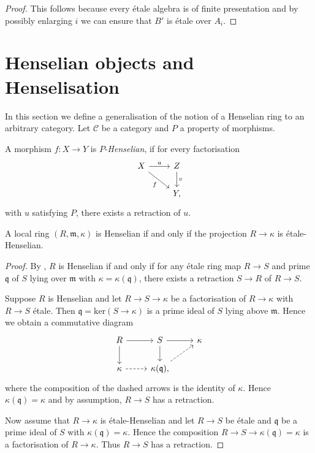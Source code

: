 \begin{proof}
    This follows because every étale algebra is of finite presentation and by possibly enlarging $i$ we can ensure
    that $B'$ is étale over $A_i$.
\end{proof}

\section{Henselian objects and Henselisation}

In this section we define a generalisation of the notion of a Henselian ring to an arbitrary category. Let $\mathcal{C}$ be a category
and $P$ a property of morphisms.

\begin{definition}[Henselian]
    A morphism $f\colon X \to Y$ is $P$-\emph{Henselian}, if for every factorisation
    \[
    \begin{tikzcd}
        X \arrow{r}{u} \arrow[swap]{dr}{f} & Z \arrow{d}{v} \\
                    & Y,
    \end{tikzcd}
    \] with $u$ satisfying $P$, there exists a retraction of $u$.
\end{definition}

\begin{example}
    A local ring $(R, \mathfrak{m}, \kappa)$ is Henselian if and only if the projection $R \to \kappa$ is étale-Henselian.
\end{example}

\begin{proof}
    By {\cite[\href{https://stacks.math.columbia.edu/tag/04GG}{Tag 04GG}]{stacks-project}}, $R$ is Henselian if and only if
    for any étale ring map $R \to S$ and prime $\mathfrak{q}$ of $S$ lying over $\mathfrak{m}$ with $\kappa = \kappa(\mathfrak{q})$,
    there exists a retraction $S \to R$ of $R \to S$.

    Suppose $R$ is Henselian and let $R \to S \to \kappa$ be a factorisation of $R \to \kappa$ with $R \to S$ étale. Then
    $\mathfrak{q} = \mathrm{ker}(S \to \kappa)$ is a prime ideal of $S$ lying above $\mathfrak{m}$. Hence we obtain a commutative
    diagram
    \[
        \begin{tikzcd}
        R \arrow{r} \arrow{d} & S \arrow{r} \arrow{d} & \kappa \\
        \kappa \arrow[dashed]{r} & \kappa(\mathfrak{q}) \arrow[dashed]{ur},
        \end{tikzcd}
    \] where the composition of the dashed arrows is the identity of $\kappa$. Hence $\kappa(\mathfrak{q}) = \kappa$ and by assumption,
    $R \to S$ has a retraction.

    Now assume that $R \to \kappa$ is étale-Henselian and let $R \to S$ be étale and $\mathfrak{q}$ be a prime ideal of $S$ with
    $\kappa(\mathfrak{q}) = \kappa$. Hence the composition $R \to S \to \kappa(\mathfrak{q}) = \kappa$ is a factorisation
    of $R \to \kappa$. Thus $R \to S$ has a retraction.
\end{proof}


